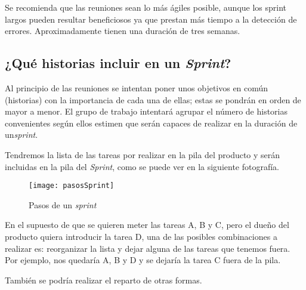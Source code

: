 Se recomienda que las reuniones sean lo más ágiles posible, aunque los sprint largos pueden resultar beneficiosos ya que prestan más tiempo a la detección de errores. Aproximadamente tienen una duración de tres semanas.

\subsection{\textbf{¿Qué historias incluir en un \textit{Sprint}?}}

Al principio de las reuniones se intentan poner unos objetivos en común (historias) con la importancia de cada una de ellas; estas se pondrán en orden de mayor a menor. El grupo de trabajo intentará agrupar el número de historias convenientes según ellos estimen que serán
capaces de realizar en la duración de un\textit{sprint}.

Tendremos la lista de las tareas por realizar en la pila del producto y serán incluidas en la pila del \textit{Sprint}, como se puede ver en la siguiente fotografía.

\begin{wrapfigure}{l}{0.3\linewidth}
    \centering
    \texttt{[image: pasosSprint]}
    \caption{Pasos de un \textit{sprint}}
\end{wrapfigure}

En el supuesto de que se quieren meter las tareas A, B y C, pero el dueño del producto quiera introducir la tarea D, una de las posibles combinaciones a realizar es: reorganizar la lista y dejar alguna de las tareas que tenemos fuera. Por ejemplo, nos quedaría A, B y D y se dejaría la tarea C fuera de la pila.

También se podría realizar el reparto de otras formas.\\


